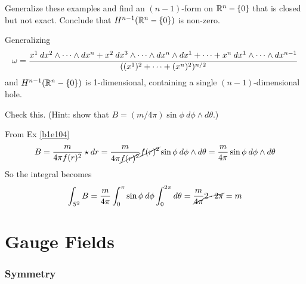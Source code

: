 \documentclass[10pt]{article}
\begin{document}
\begin{example}
	Generalize these examples and find an $(n-1)$-form on $\mathbb{R}^n - \lbrace0\rbrace$ that is closed but not exact. Conclude that $H^{n-1}(\mathbb{R}^n - \lbrace0\rbrace)$ is non-zero.
\end{example}
\sol Generalizing
$$
\omega = \frac{x^1\: dx^2 \wedge \cdots \wedge dx^n + x^2\: dx^3 \wedge \cdots \wedge dx^n \wedge dx^1 + \cdots + x^n\: dx^1 \wedge \cdots \wedge dx^{n-1}}{\lparen(x^1)^2+\cdots+(x^n)^2\rparen^{n/2}}
$$
and $H^{n-1}(\mathbb{R}^n - \lbrace0\rbrace)$ is 1-dimensional, containing a single $(n-1)$-dimensional hole.


\begin{example}
	Check this. (Hint: show that $B = (m/4\pi)\sin\phi\:d\phi \wedge d\theta$.)
\end{example}
\sol From Ex \ref{b1e104}
$$
B = \frac{m}{4\pi f(r)^2}\star dr = \frac{m}{4\pi \cancel{f(r)^2}} \cancel{f(r)^2} \sin\phi\:d\phi \wedge d\theta = \frac{m}{4\pi} \sin\phi\:d\phi \wedge d\theta
$$
So the integral becomes
$$
\int_{S^2} B = \frac{m}{4\pi} \int_{0}^{\pi} \sin\phi\:d\phi \int_{0}^{2\pi} d\theta = \frac{m}{\cancel{4\pi}} \cancel{2 \cdot 2\pi} = m
$$





\newpage
\part{Gauge Fields}






\section{Symmetry}\label{b2c1}
\end{document}
